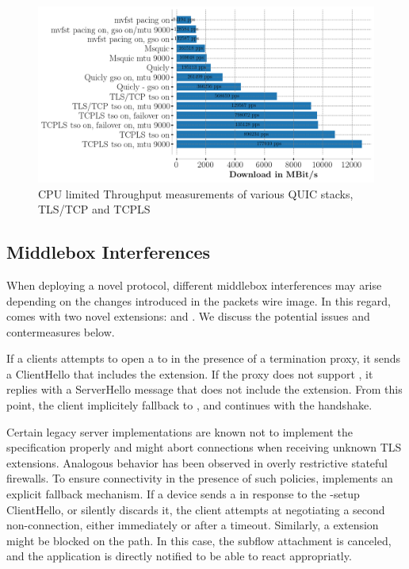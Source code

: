 \begin{figure}[!t] \begin{center}
    \includegraphics[width=\columnwidth]{figures/perf_analysis.png} \end{center}
  \caption{CPU limited Throughput measurements of various QUIC stacks, TLS/TCP and TCPLS}
  \label{fig:perf} \end{figure}

\subsection{Middlebox Interferences}

When deploying a novel protocol, different middlebox interferences may arise
depending on the changes introduced in the packets wire image. In this
regard, \tcpls comes with two novel \tls extensions: \tcpls and \join.
We discuss the potential issues and contermeasures below.

If a clients attempts to open a \tcpls to in the presence of a \tls termination
proxy, it sends a ClientHello that includes the \tcpls extension. If the proxy
does not support \tcpls, it replies with a ServerHello message that does not
include the \tcpls extension. From this point, the client implicitely fallback
to \tls, and continues with the handshake.

Certain legacy \tls server implementations are known not to implement the \tls
specification properly and might abort connections when receiving unknown TLS
extensions. Analogous behavior has been observed in overly restrictive stateful
firewalls.  To ensure connectivity in the presence of such policies, \tcpls
implements an explicit fallback mechanism. If a device sends a \tcp \rst in
response to the \tcpls-setup ClientHello, or silently discards it, the client
attempts at negotiating a second non-\tcpls \tls connection, either immediately
or after a timeout. Similarly, a \tcpls \join extension might be blocked on the
path. In this case, the subflow attachment is canceled, and the application
is directly notified to be able to react appropriatly.

